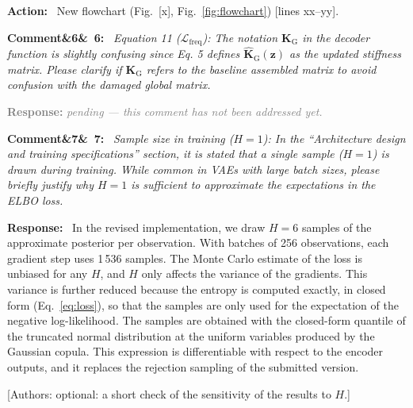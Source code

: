 \documentclass[11pt]{article}
\newenvironment{rcomment}[1]{\par\bigskip\noindent\textbf{Comment\ifx&#1&\else\ #1\fi:}\ \itshape}{\par}
\newenvironment{response}{\par\smallskip\noindent\color{resp}\textbf{Response:}\ }{\par}
\newenvironment{action}{\par\smallskip\noindent\color{resp}\textbf{Action:}\ }{\par}
\newcommand{\pending}{\par\smallskip\noindent\textcolor{gray}{\textbf{Response:} \textit{pending --- this comment
has not been addressed yet.}}\par}
\newcommand{\authornote}[1]{\textcolor{note}{\textsf{[Authors: #1]}}}
\newcommand{\tbd}[1]{\textcolor{note}{\textsf{[#1]}}}
\newcommand{\lines}[1]{\tbd{lines #1}}
\newcommand{\z}{\mathbf{z}}
\begin{document}
\begin{action}
New flowchart (Fig.~\tbd{x}, Fig.~\ref{fig:flowchart}) \lines{xx--yy}.
\end{action}

\begin{rcomment}{6}
Equation 11 ($\mathcal{L}_{\mathrm{freq}}$): The notation $\mathbf{K}_{\mathrm{G}}$ in the decoder function is slightly
confusing since Eq. 5 defines $\hat{\mathbf{K}}_{\mathrm{G}}(\z)$ as the updated stiffness matrix. Please clarify if
$\mathbf{K}_{\mathrm{G}}$ refers to the baseline assembled matrix to avoid confusion with the damaged global matrix.
\end{rcomment}
\pending

\begin{rcomment}{7}
Sample size in training ($H=1$): In the ``Architecture design and training specifications'' section, it is stated that
a single sample ($H=1$) is drawn during training. While common in VAEs with large batch sizes, please briefly justify why
$H=1$ is sufficient to approximate the expectations in the ELBO loss.
\end{rcomment}

\begin{response}
In the revised implementation, we draw $H=6$ samples of the approximate posterior per observation. With batches of 256
observations, each gradient step uses 1\,536 samples. The Monte Carlo estimate of the loss is unbiased for any $H$, and
$H$ only affects the variance of the gradients. This variance is further reduced because the entropy is computed
exactly, in closed form (Eq.~\eqref{eq:loss}), so that the samples are only used for the expectation of the negative
log-likelihood. The samples are obtained with the closed-form quantile of the truncated normal distribution at the uniform
variables produced by the Gaussian copula. This expression is differentiable with respect to the encoder outputs, and it
replaces the rejection sampling of the submitted version.
\end{response}
\authornote{optional: a short check of the sensitivity of the results to $H$.}
\end{document}
